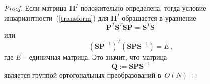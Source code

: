 \begin{proof}
Если матрица $\textbf{H}^I$ положительно определена, тогда условие инвариантности~(\ref{transform}) для $\textbf{H}^I$ обращается в уравнение
%
\begin{equation}
\textbf{P}^T \textbf{S}^T\textbf{SP} = \textbf{S}^T\textbf{S} \,
\end{equation}
%
или
%
\begin{equation}
\label{eqn:unit_matr}
(\textbf{SP}^{-1})^T  (\textbf{SPS}^{-1}) =  E \, ,
\end{equation}
%
где $E$ -- единичная матрица. Это значит, что матрица
%
\begin{equation}
\label{eq:Qdef}
\textbf{Q}:=\textbf{SPS}^{-1}
\end{equation}
является группой ортогональных преобразований в~$O(N)$ %
\end{proof}

